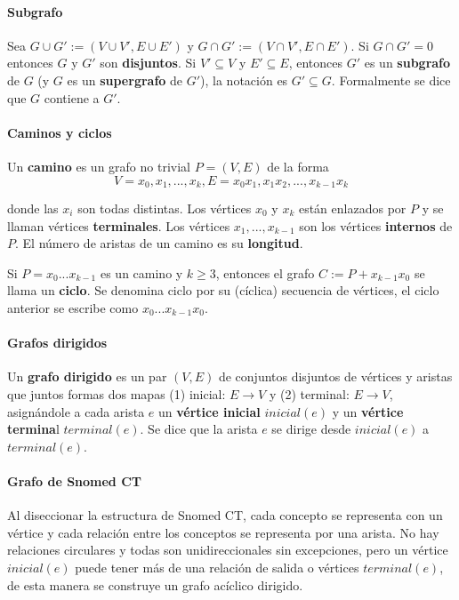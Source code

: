 \paragraph{Subgrafo}
Sea $G\cup  G':=(V\cup  V', E\cup  E')$ y $G\cap  G':=(V\cap  V', E\cap  E')$. Si $G\cap G' = 0$  entonces $G$ y $G'$ son \textbf{disjuntos}. Si  $V'\subseteq V$ y $E'\subseteq E$, entonces $G'$ es un \textbf{subgrafo} de $G$ (y $G$ es un \textbf{supergrafo} de $G'$), la notación es $G'\subseteq G$. Formalmente se dice que $G$ contiene a $G'$.

\paragraph{Caminos y ciclos}
Un \textbf{camino} es un grafo no trivial $P=(V,E)$ de la forma 
\begin{equation}
V={x_{0},x_{1},...,x_{k}}, E={x_{0}x_{1},x_{1}x_{2},...,x_{k-1}x_{k}}
\end{equation}

donde las $x_{i}$ son todas distintas. Los vértices $x_{0}$ y $x_{k}$ están enlazados por $P$ y se llaman vértices \textbf{terminales}. Los vértices $x_{1},...,x_{k-1}$ son los vértices \textbf{internos} de $P$. El número de aristas de un camino es su \textbf{longitud}.

Si $P=x_{0}...x_{k-1}$ es un camino y $k\geq 3$, entonces el grafo $C:=P+x_{k-1}x_{0}$ se llama un \textbf{ciclo}. Se denomina ciclo por su (cíclica) secuencia de vértices, el ciclo anterior se escribe como $x_{0}...x_{k-1}x_{0}$.

\paragraph{Grafos dirigidos}
Un \textbf{grafo dirigido} es un par $(V,E)$ de conjuntos disjuntos de vértices y aristas que juntos formas dos mapas (1) inicial: $E\rightarrow V$ y (2) terminal: $E\rightarrow V$, asignándole a cada arista $e$ un \textbf{vértice inicial} $inicial(e)$ y un \textbf{vértice termina}l $terminal(e)$. Se dice que la arista $e$ se dirige desde $inicial(e)$ a $terminal(e)$.

\paragraph{Grafo de Snomed CT}
Al diseccionar la estructura de Snomed CT, cada concepto se representa con un vértice y cada relación entre los conceptos se representa por una arista. No hay relaciones circulares y todas son unidireccionales sin excepciones, pero un vértice $inicial(e)$ puede tener más de una relación de salida o vértices $terminal(e)$, de esta manera se construye un grafo acíclico dirigido. \cite{Bhattacharyya2016}

